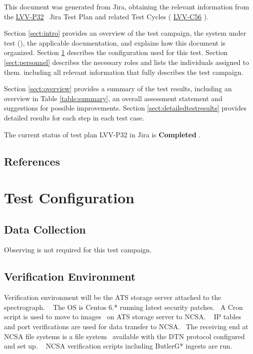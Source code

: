 \documentclass[DM,STR,toc]{lsstdoc}
\begin{document}
This document was generated from Jira, obtaining the relevant information from the 
\href{https://jira.lsstcorp.org/secure/Tests.jspa#/testPlan/LVV-P32}{LVV-P32}
~Jira Test Plan and related Test Cycles (
  \href{https://jira.lsstcorp.org/secure/Tests.jspa#/testCycle/LVV-C56}{LVV-C56}
).

Section \ref{sect:intro} provides an overview of the test campaign, the system under test (\product{}),
the applicable documentation, and explains how this document is organized.
Section \ref{sect:configuration}  describes the configuration used for this test.
Section \ref{sect:personnel} describes the necessary roles and lists the individuals assigned to them.
including all relevant information that fully describes the test campaign.

Section \ref{sect:overview} provides a summary of the test results, including an overview in Table \ref{table:summary},
an overall assessment statement and suggestions for possible improvements.
Section \ref{sect:detailedtestresults} provides detailed results for each step in each test case.

The current status of test plan LVV-P32 in Jira is \textbf{ Completed }.

\subsection{References}
\label{sect:references}
\renewcommand{\refname}{}

\section{Test Configuration}
\label{sect:configuration}

\subsection{Data Collection}

  Observing is not required for this test campaign.

\subsection{Verification Environment}
\label{sect:hwconf}
  Verification environment will be the ATS storage server attached to the
spectrograph. ~ The OS is Centos 6.* running latest security patches. ~A
Cron script is used to move to images ~on ATS storage server to NCSA. ~
IP tables and port verifications are used for data transfer to NCSA.
~The receiving end at NCSA file systems is a file system ~available with
the DTN protocol configured and set up. ~ NCSA verification scripts
including ButlerG* ingests are run. ~\\[3\baselineskip]
\end{document}
